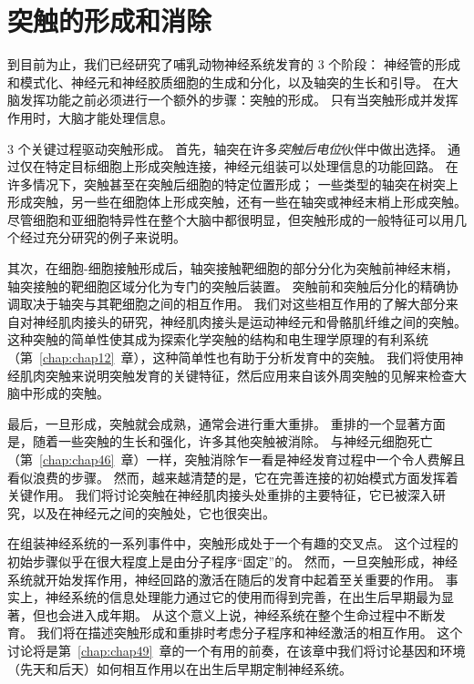 \chapter{突触的形成和消除} \label{chap:chap48}


到目前为止，我们已经研究了哺乳动物神经系统发育的 3 个阶段：
神经管的形成和模式化、神经元和神经胶质细胞的生成和分化，以及轴突的生长和引导。
在大脑发挥功能之前必须进行一个额外的步骤：突触的形成。
只有当突触形成并发挥作用时，大脑才能处理信息。


3 个关键过程驱动突触形成。
首先，轴突在许多\textit{突触后电位}伙伴中做出选择。
通过仅在特定目标细胞上形成突触连接，神经元组装可以处理信息的功能回路。
在许多情况下，突触甚至在突触后细胞的特定位置形成；
一些类型的轴突在树突上形成突触，另一些在细胞体上形成突触，还有一些在轴突或神经末梢上形成突触。
尽管细胞和亚细胞特异性在整个大脑中都很明显，但突触形成的一般特征可以用几个经过充分研究的例子来说明。


其次，在细胞-细胞接触形成后，轴突接触靶细胞的部分分化为突触前神经末梢，轴突接触的靶细胞区域分化为专门的突触后装置。
突触前和突触后分化的精确协调取决于轴突与其靶细胞之间的相互作用。
我们对这些相互作用的了解大部分来自对神经肌肉接头的研究，神经肌肉接头是运动神经元和骨骼肌纤维之间的突触。
这种突触的简单性使其成为探索化学突触的结构和电生理学原理的有利系统（第~\ref{chap:chap12}~章），这种简单性也有助于分析发育中的突触。
我们将使用神经肌肉突触来说明突触发育的关键特征，然后应用来自该外周突触的见解来检查大脑中形成的突触。


最后，一旦形成，突触就会成熟，通常会进行重大重排。
重排的一个显著方面是，随着一些突触的生长和强化，许多其他突触被消除。
与神经元细胞死亡（第~\ref{chap:chap46}~章）一样，突触消除乍一看是神经发育过程中一个令人费解且看似浪费的步骤。
然而，越来越清楚的是，它在完善连接的初始模式方面发挥着关键作用。
我们将讨论突触在神经肌肉接头处重排的主要特征，它已被深入研究，以及在神经元之间的突触处，它也很突出。


在组装神经系统的一系列事件中，突触形成处于一个有趣的交叉点。
这个过程的初始步骤似乎在很大程度上是由分子程序“固定”的。
然而，一旦突触形成，神经系统就开始发挥作用，神经回路的激活在随后的发育中起着至关重要的作用。
事实上，神经系统的信息处理能力通过它的使用而得到完善，在出生后早期最为显著，但也会进入成年期。
从这个意义上说，神经系统在整个生命过程中不断发育。
我们将在描述突触形成和重排时考虑分子程序和神经激活的相互作用。
这个讨论将是第~\ref{chap:chap49}~章的一个有用的前奏，在该章中我们将讨论基因和环境（先天和后天）如何相互作用以在出生后早期定制神经系统。




